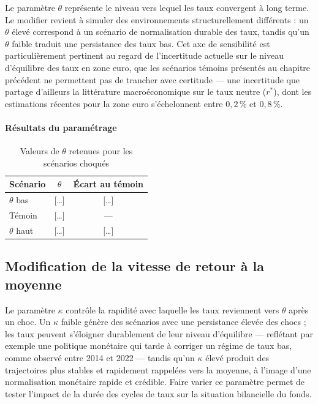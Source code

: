 Le paramètre $\theta$ représente le niveau vers lequel les taux convergent à long terme. Le modifier revient à simuler des environnements structurellement différents : un $\theta$ élevé correspond à un scénario de normalisation durable des taux, tandis qu'un $\theta$ faible traduit une persistance des taux bas. Cet axe de sensibilité est particulièrement pertinent au regard de l'incertitude actuelle sur le niveau d'équilibre des taux en zone euro, que les scénarios témoins présentés au chapitre précédent ne permettent pas de trancher avec certitude — une incertitude que partage d'ailleurs la littérature macroéconomique sur le taux neutre ($r^*$), dont les estimations récentes pour la zone euro s'échelonnent entre $0{,}2\,\%$ et $0{,}8\,\%$.

\paragraph{Résultats du paramétrage}

\begin{table}[H]
    \centering
    \caption{Valeurs de $\theta$ retenues pour les scénarios choqués}
    \label{tab:scenarios_theta}
    \begin{tabular}{|l|c|c|}
        \hline
        \textbf{Scénario} & \textbf{$\theta$} & \textbf{Écart au témoin} \\
        \hline
        $\theta$ bas  & {[\ldots]} & {[\ldots]} \\
        Témoin        & {[\ldots]} & ---        \\
        $\theta$ haut & {[\ldots]} & {[\ldots]} \\
        \hline
    \end{tabular}
\end{table}

\subsection{Modification de la vitesse de retour à la moyenne}

Le paramètre $\kappa$ contrôle la rapidité avec laquelle les taux reviennent vers $\theta$ après un choc. Un $\kappa$ faible génère des scénarios avec une persistance élevée des chocs ; les taux peuvent s'éloigner durablement de leur niveau d'équilibre — reflétant par exemple une politique monétaire qui tarde à corriger un régime de taux bas, comme observé entre 2014 et 2022 — tandis qu'un $\kappa$ élevé produit des trajectoires plus stables et rapidement rappelées vers la moyenne, à l'image d'une normalisation monétaire rapide et crédible. Faire varier ce paramètre permet de tester l'impact de la durée des cycles de taux sur la situation bilancielle du fonds.

